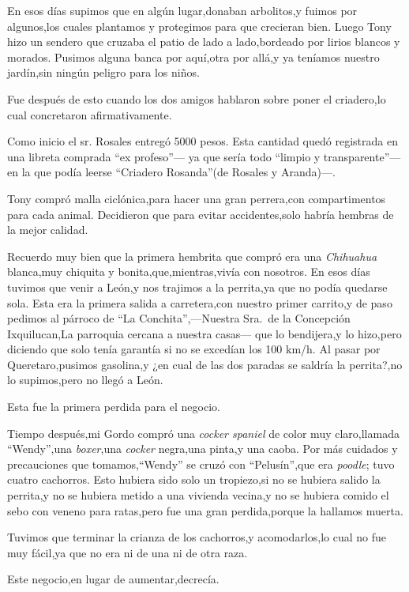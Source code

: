 \documentclass[letterpaper,12pt]{book}
\begin{document}
En esos días supimos que en algún lugar,donaban arbolitos,y fuimos por algunos,los cuales plantamos y protegimos para que crecieran bien. Luego Tony hizo un sendero que cruzaba el patio de lado a lado,bordeado por lirios blancos y morados. Pusimos alguna banca por aquí,otra por allá,y ya teníamos nuestro jardín,sin ningún peligro para los niños.

Fue después de esto cuando los dos amigos hablaron sobre poner el criadero,lo cual concretaron afirmativamente.

Como inicio el sr. Rosales entregó 5000 pesos. Esta cantidad quedó registrada en una libreta comprada ``ex profeso''--- ya que sería todo ``limpio y transparente''--- en la que podía leerse ``Criadero Rosanda''(de Rosales y Aranda)---.

Tony compró malla ciclónica,para hacer una gran perrera,con compartimentos para cada animal. Decidieron que para evitar accidentes,solo habría hembras de la mejor calidad.

Recuerdo muy bien que la primera hembrita que compró era una {\it Chihuahua}\/ blanca,muy chiquita y bonita,que,mientras,vivía con nosotros. En esos días tuvimos que venir a León,y nos trajimos a la perrita,ya que no podía quedarse sola. Esta era la primera salida a carretera,con nuestro primer carrito,y de paso pedimos al párroco de ``La Conchita'',---Nuestra Sra.\ de la Concepción Ixquilucan,La parroquia cercana a nuestra casas--- que lo bendijera,y lo hizo,pero diciendo que solo tenía garantía si no se excedían los 100 km/h. Al pasar por Queretaro,pusimos gasolina,y ¿en cual de las dos paradas se saldría la perrita?,no lo supimos,pero no llegó a León. 

Esta fue la primera perdida para el negocio.

Tiempo después,mi Gordo compró una {\it cocker spaniel}\/ de color muy claro,llamada ``Wendy'',una {\it boxer},una {\it cocker}\/ negra,una pinta,y una caoba. Por más cuidados y precauciones que tomamos,``Wendy'' se cruzó con ``Pelusín'',que era {\it poodle}\/; tuvo cuatro cachorros. Esto hubiera sido solo un tropiezo,si no se hubiera salido la perrita,y no se hubiera metido a una vivienda vecina,y no se hubiera comido el sebo con veneno para ratas,pero fue una gran perdida,porque la hallamos muerta. 

Tuvimos que terminar la crianza de los cachorros,y acomodarlos,lo cual no fue muy fácil,ya que no era ni de una ni de otra raza.

Este negocio,en lugar de aumentar,decrecía.
\end{document}
